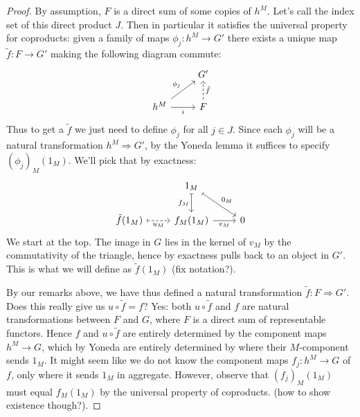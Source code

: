 \documentclass[12pt]{article}
\begin{document}
\begin{proof}
	By assumption, $F$ is a direct sum of some copies of $h^M$. Let's call the index set of this direct product $J$. Then in particular it satisfies the universal property for coproducts: given a family of maps $\phi_j:h^M\to G'$ there exists a unique map $\tilde{f}:F\to G'$ making the following diagram commute:
	\begin{equation*}
\begin{tikzcd}
                                       & G'                                \\
h^M \arrow[r, "i"'] \arrow[ru, "\phi_j"] & F \arrow[u, "\tilde{f}"', dashed]
\end{tikzcd}
	\end{equation*}
	Thus to get a $\tilde{f}$ we just need to define $\phi_j$ for all $j\in J$. Since each $\phi_j$ will be a natural transformation $h^M\Rightarrow G'$, by the Yoneda lemma it suffices to specify $(\phi_j)_M(1_M)$. We'll pick that by exactness:
	\begin{equation*}
\begin{tikzcd}
                                                  & 1_M \arrow[d, "f_M"', maps to] \arrow[rd, "0_M", maps to] &   \\
\tilde{f}(1_M) \arrow[r, "u_M"', dashed, maps to] & f_M(1_M) \arrow[r, "v_M"']                                & 0
\end{tikzcd}
	\end{equation*}
	We start at the top. The image in $G$ lies in the kernel of $v_M$ by the commutativity of the triangle, hence by exactness pulls back to an object in $G'$. This is what we will define as $\tilde{f}(1_M)$ (fix notation?).

	By our remarks above, we have thus defined a natural transformation $\tilde{f}:F\Rightarrow G'$. Does this really give us $u\circ\tilde{f}=f$? Yes: both $u\circ \tilde{f}$ and $f$ are natural transformations between $F$ and $G$, where $F$ is a direct sum of representable functors. Hence $f$ and $u\circ\tilde{f}$ are entirely determined by the component maps $h^M\to G$, which by Yoneda are entirely determined by where their $M$-component sends $1_M$. It might seem like we do not know the component maps $f_j:h^M\to G$ of $f$, only where it sends $1_M$ in aggregate. However, observe that $(f_j)_M(1_M)$ must equal $f_M(1_M)$ by the universal property of coproducts. (how to show existence though?).
\end{proof}
\end{document}
